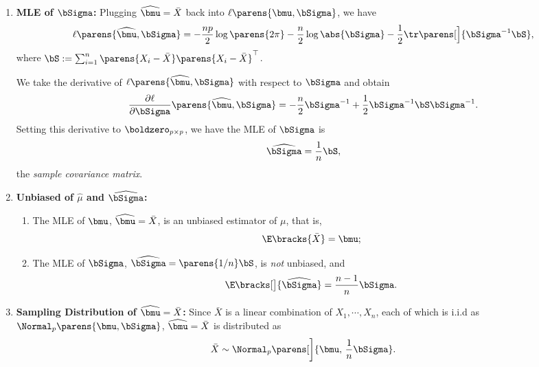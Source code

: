\documentclass[12pt]{article}
\begin{document}
\begin{enumerate}[label=\textbf{\arabic*.}]
	\item \textbf{MLE of $\bSigma$:} Plugging $\widehat{\bmu} = \bar{X}$ back into $\ell \parens{\bmu, \bSigma}$, we have 
	\begin{align*}
		\ell \parens{\widehat{\bmu}, \bSigma} = - \frac{np}{2} \log \parens{2 \pi} - \frac{n}{2} \log \abs{\bSigma} - \frac{1}{2} \tr \parens[\Big]{\bSigma^{-1} \bS}, 
	\end{align*}
	where $\bS := \sum_{i=1}^n \parens{X_i - \bar{X}} \parens{X_i - \bar{X}}^\top$. 
	
	We take the derivative of $\ell \parens{\widehat{\bmu}, \bSigma}$ with respect to $\bSigma$ and obtain 
	\begin{align*}
		\frac{\partial \ell}{\partial \bSigma} \parens{\widehat{\bmu}, \bSigma} = - \frac{n}{2} \bSigma^{-1} + \frac{1}{2} \bSigma^{-1} \bS \bSigma^{-1}. 
	\end{align*}
	Setting this derivative to $\boldzero_{p \times p}$, we have the MLE of $\bSigma$ is 
	\begin{align*}
		\widehat{\bSigma} = \frac{1}{n} \bS, 
	\end{align*}
	the \textit{sample covariance matrix}. 
	
	\item \textbf{Unbiased of $\widehat{\mu}$ and $\widehat{\bSigma}$:} 
	\begin{enumerate}
		\item The MLE of $\bmu$, $\widehat{\bmu} = \bar{X}$, is an unbiased estimator of $\mu$, that is, 
		\begin{align*}
			\E \bracks{\bar{X}} = \bmu; 
		\end{align*}
		\item The MLE of $\bSigma$, $\widehat{\bSigma} = \parens{1/n} \bS$, is \textit{not} unbiased, and 
		\begin{align*}
			\E \bracks[\big]{\widehat{\bSigma}} = \frac{n-1}{n} \bSigma. 
		\end{align*}
	\end{enumerate}
	
	\item \textbf{Sampling Distribution of $\widehat{\bmu} = \bar{X}$:} Since $\bar{X}$ is a linear combination of $X_1, \cdots, X_n$, each of which is i.i.d as $\Normal_p \parens{\bmu, \bSigma}$, $\widehat{\bmu} = \bar{X}$ is distributed as 
	\begin{align*}
		\bar{X} \sim \Normal_p \parens[\bigg]{\bmu, \, \frac{1}{n} \bSigma}. 
	\end{align*}
	

\end{enumerate}
\end{document}
